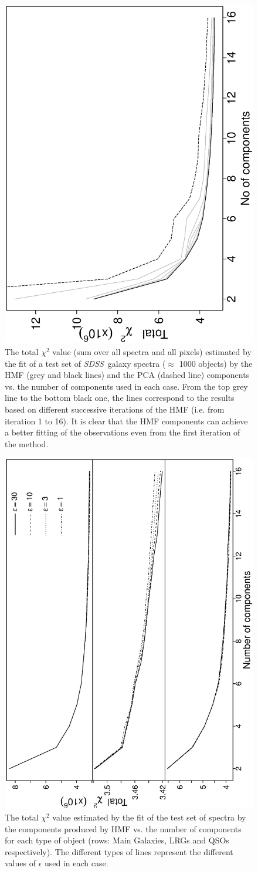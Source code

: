 \documentclass[12pt,preprint]{aastex}
\newcommand{\project}[1]{\textsl{#1}}
\newcommand{\sdss}{\project{SDSS}}
\newcommand{\SDSS}{\sdss}
\begin{document}
\clearpage
\begin{figure}
\includegraphics[angle=-90,width=0.49\columnwidth]{paper_plots/proposal1}
\caption{The total $\chi^2$ value (sum over all spectra and all pixels) estimated by the fit of a test set of \SDSS\ galaxy spectra ($\approx$ 1000 objects) by the HMF (grey and black lines) and the PCA (dashed line) components vs. the number of components used in each case. From the top grey line to the bottom black one, the lines correspond to the results based on different successive iterations of the HMF (i.e. from iteration 1 to 16). It is clear that the HMF components can achieve a better fitting of the observations even from the first iteration of the method.}
\label{fig:2b}
\end{figure}

\clearpage
\begin{figure}
\includegraphics[angle=-90,width=0.49\columnwidth]{paper_plots/fig5}
\caption{The total $\chi^2$ value estimated by the fit of the test set
  of spectra by the components produced by HMF vs. the number
  of components for each type of object (rows: Main Galaxies, LRGs and QSOs
  respectively). The different types of lines represent the different
  values of $\epsilon$ used in each case.}
\label{fig:3}
\end{figure}
\end{document}
